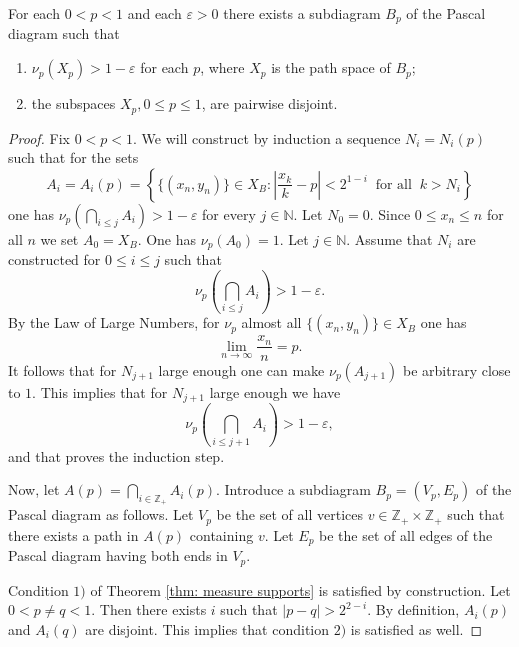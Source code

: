 \documentclass[10pt,a4paper]{amsart}
\begin{document}
\begin{thm}\label{thm: measure supports}
For each $0 < p < 1$ and each $\varepsilon > 0$ there exists a subdiagram $B_p$  of the Pascal diagram such that 
\begin{enumerate} \item[$1)$] 
$\nu_p(X_p) > 1 - \varepsilon$ for each $p$, where $X_p$ is the path space of $B_p$; 
\item[$2)$] the subspaces $X_p,0\leqslant p\leqslant 1$, are pairwise disjoint.
\end{enumerate}
\end{thm}

\begin{proof} 

Fix $0<p<1$. We will construct by induction a sequence $N_i=N_i(p)$ such that for the sets 
$$A_i=A_i(p)=\left\{\{(x_n,y_n)\}\in X_B:\left|\frac{x_k}{k} -p\right|<2^{1-i}\;\;\text{for all}\;\;k > N_i\right\}$$ 
one has  $\nu_p(\bigcap_{i\leqslant j}A_i)>1 - \varepsilon$ for every $j\in\mathbb N$. Let $N_0=0$.
\vskip 0.1cm
 Since $0\leqslant x_n\leqslant n$ for all $n$ we set $A_0=X_B$. One has $\nu_p(A_0)=1.$
\vskip 0.1cm
 Let $j\in\mathbb N$. Assume that $N_i$ are constructed for $0\leqslant i\leqslant j$ such that 
$$
\nu_p\left(\bigcap_{i\leqslant j}A_i\right) > 1 - \varepsilon.
$$ 
By the Law of Large Numbers, for $\nu_p$ almost all $\{(x_n,y_n)\}\in X_B$ one has 
$$
\lim_{n \rightarrow \infty} \frac{x_n}{n} = p.
$$ 
It follows that for $N_{j+1}$ large enough one can make $\nu_p(A_{j+1})$ be arbitrary close to $1$. This implies that for $N_{j+1}$ large enough we have
$$\nu_p\left(\bigcap_{i\leqslant j+1}A_i\right)
> 1 - \varepsilon,
$$
and that proves the induction step.

Now, let $A(p)=\bigcap_{i\in\mathbb Z_+}A_i(p)$. Introduce a subdiagram $B_p=(V_p,E_p)$ of the Pascal diagram as follows. Let $V_p$ be the set of all vertices $v\in \mathbb Z_+\times\mathbb Z_+$ such that there exists a path in $A(p)$ containing $v$. Let $E_p$ be the set of all edges of the Pascal diagram having both ends in $V_p$. 

Condition $1)$ of Theorem \ref{thm: measure supports} is satisfied by construction. Let $0 < p\neq q < 1$. Then there exists $i$ such that $|p-q|>2^{2-i}$. By definition, $A_i(p)$ and $A_i(q)$ are disjoint. This implies that condition $2)$ is satisfied as well.
\end{proof}
\end{document}
